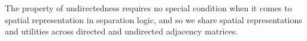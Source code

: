 
The property of undirectedness requires no special condition 
when it comes to spatial representation in separation logic, 
and so we share spatial representations and utilities 
across directed and undirected adjacency matrices.


\lstset{style=myTinyStyle}


